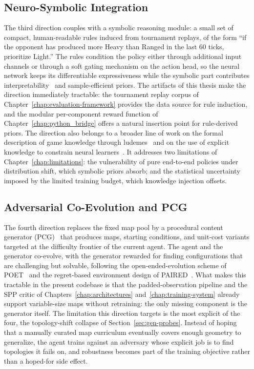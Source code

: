 \subsection{Neuro-Symbolic Integration}

The third direction couples  with a symbolic reasoning module: a small set of compact, human-readable rules induced from tournament replays, of the form ``if the opponent has produced more Heavy than Ranged in the last $60$ ticks, prioritize Light.'' The rules condition the policy either through additional input channels or through a soft gating mechanism on the action head, so the neural network keeps its differentiable expressiveness while the symbolic part contributes interpretability~\cite{baeInterpretableReinforcementLearning2022} and sample-efficient priors. The artifacts of this thesis make the direction immediately tractable: the tournament replay corpus of Chapter~\ref{chap:evaluation-framework} provides the data source for rule induction, and the modular per-component reward function of Chapter~\ref{chap:python_bridge} offers a natural insertion point for rule-derived priors. The direction also belongs to a broader line of work on the formal description of game knowledge through ludemes~\cite{pietteericLudiiLudemicGeneral2020} and on the use of explicit knowledge to constrain neural learners~\cite{silvestriInjectingDomainKnowledge2021}. It addresses two limitations of Chapter~\ref{chap:limitations}: the vulnerability of pure end-to-end policies under distribution shift, which symbolic priors absorb; and the statistical uncertainty imposed by the limited training budget, which knowledge injection offsets.

\subsection{Adversarial Co-Evolution and PCG}

The fourth direction replaces the fixed map pool by a procedural content generator (PCG)~\cite{sorochanGeneratingRealTimeStrategy2022} that produces maps, starting conditions, and unit-cost variants targeted at the difficulty frontier of the current agent. The agent and the generator co-evolve, with the generator rewarded for finding configurations that are challenging but solvable, following the open-ended-evolution scheme of POET~\cite{wangPairedOpenEndedTrailblazer2019} and the regret-based environment design of PAIRED~\cite{dennisEmergentComplexityZeroshot2021}. What makes this tractable in the present codebase is that the padded-observation pipeline and the SPP critic of Chapters~\ref{chap:architectures} and~\ref{chap:training-system} already support variable-size maps without retraining: the only missing component is the generator itself. The limitation this direction targets is the most explicit of the four, the topology-shift collapse of Section~\ref{sec:gen-probes}. Instead of hoping that a manually curated map curriculum eventually covers enough geometry to generalize, the agent trains against an adversary whose explicit job is to find topologies it fails on, and robustness becomes part of the training objective rather than a hoped-for side effect.

